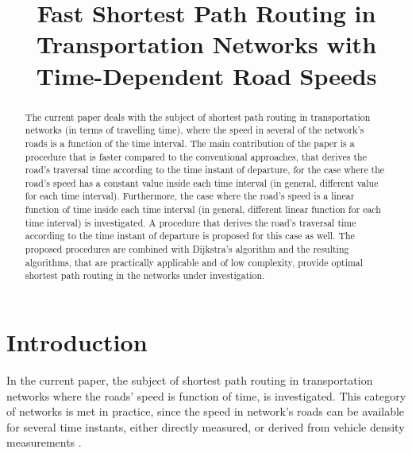 \documentclass[conference]{IEEEtran}
\begin{document}
\title{Fast Shortest Path Routing in Transportation Networks with Time-Dependent Road Speeds}
\author{
}
\maketitle



\begin{abstract}
The current paper deals with the subject of shortest path routing in transportation networks (in terms of travelling time), where the speed in several of the network's roads is a function of the time interval. The main contribution of the paper is a procedure that is faster compared to the conventional approaches, that derives the road's traversal time according to the time instant of departure, for the case where the road's speed has a constant value inside each time interval (in general, different value for each time interval). Furthermore, the case where the road's speed is a linear function of time inside each time interval (in general, different linear function for each time interval) is investigated. A procedure that derives the road's traversal time according to the time instant of departure is proposed for this case as well. The proposed procedures are combined with Dijkstra's algorithm and the resulting algorithms, that are practically applicable and of low complexity, provide optimal shortest path routing in the networks under investigation.    
\end{abstract}


\section{Introduction}

In the current paper, the subject of shortest path routing in transportation networks where the roads' speed is function of time, is investigated. This category of networks is met in practice, since the speed in network's roads can be available for several time instants, either directly measured, or derived from vehicle density measurements \cite{may}.
\end{document}
